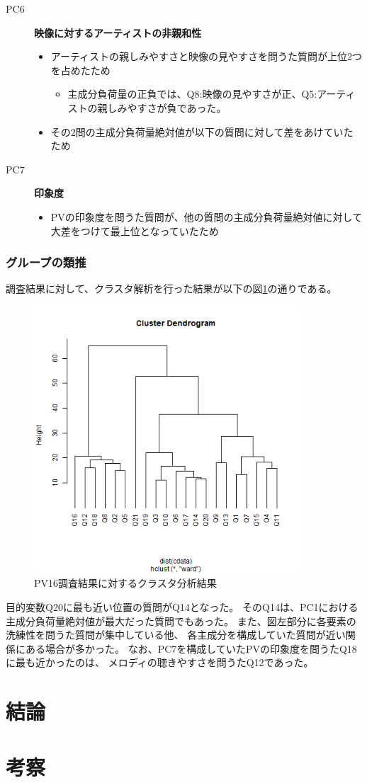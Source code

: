 \documentclass[11pt,a4paper, uplatex]{jsarticle}
\begin{document}
\begin{description}
  \item[PC6] {\bf 映像に対するアーティストの非親和性}
  \begin{itemize}
    \item アーティストの親しみやすさと映像の見やすさを問うた質問が上位2つを占めたため
    \begin{itemize}
      \item 主成分負荷量の正負では、Q8:映像の見やすさが正、Q5:アーティストの親しみやすさが負であった。
    \end{itemize}
    \item その2問の主成分負荷量絶対値が以下の質問に対して差をあけていたため
  \end{itemize}

  \item[PC7] {\bf 印象度}
  \begin{itemize}
    \item PVの印象度を問うた質問が、他の質問の主成分負荷量絶対値に対して大差をつけて最上位となっていたため
  \end{itemize}
\end{description}

\subsubsection{グループの類推}
調査結果に対して、クラスタ解析を行った結果が以下の図\ref{fig:clusterPV}の通りである。
\begin{figure}[h]
  \begin{center}
    \includegraphics[width=10cm]{clusterPV.bmp}
    \caption{PV16調査結果に対するクラスタ分析結果}
    \label{fig:clusterPV}
  \end{center}
\end{figure}
目的変数Q20に最も近い位置の質問がQ14となった。
そのQ14は、PC1における主成分負荷量絶対値が最大だった質問でもあった。
また、図左部分に各要素の洗練性を問うた質問が集中している他、
各主成分を構成していた質問が近い関係にある場合が多かった。
なお、PC7を構成していたPVの印象度を問うたQ18に最も近かったのは、
メロディの聴きやすさを問うたQ12であった。

\section{結論}
\section{考察}
\end{document}
